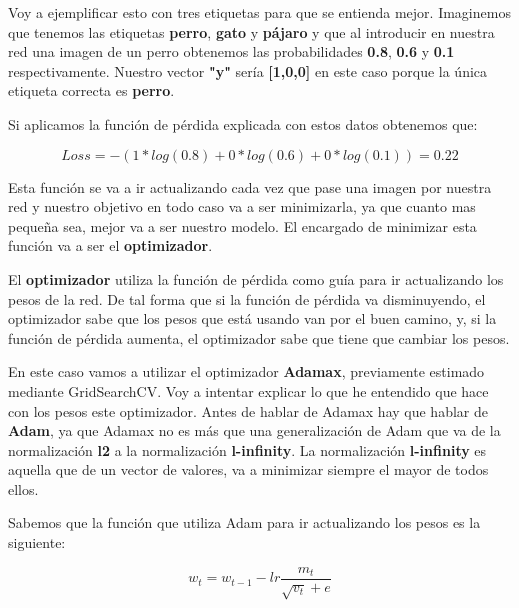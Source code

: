 Voy a ejemplificar esto con tres etiquetas para que se entienda mejor. Imaginemos que tenemos las etiquetas \textbf{perro}, \textbf{gato} y \textbf{pájaro} y que al introducir en nuestra red una imagen de un perro obtenemos las probabilidades \textbf{0.8}, \textbf{0.6} y \textbf{0.1} respectivamente. Nuestro vector \textbf{"y"} sería \textbf{[1,0,0]} en este caso porque la única etiqueta correcta es \textbf{perro}.

\vspace{2 mm}

Si aplicamos la función de pérdida explicada con estos datos obtenemos que:

\[Loss = - (1*log(0.8) + 0*log(0.6) + 0*log(0.1)) = 0.22\]


\vspace{2 mm}

Esta función se va a ir actualizando cada vez que pase una imagen por nuestra red y nuestro objetivo en todo caso va a ser minimizarla, ya que cuanto mas pequeña sea, mejor va a ser nuestro modelo. El encargado de minimizar esta función va a ser el \textbf{optimizador}.

\vspace{5 mm}

El \textbf{optimizador} utiliza la función de pérdida como guía para ir actualizando los pesos de la red. De tal forma que si la función de pérdida va disminuyendo, el optimizador sabe que los pesos que está usando van por el buen camino, y, si la función de pérdida aumenta, el optimizador sabe que tiene que cambiar los pesos.

\vspace{2 mm}

En este caso vamos a utilizar el optimizador \textbf{Adamax}, previamente estimado mediante GridSearchCV. Voy a intentar explicar lo que he entendido que hace con los pesos este optimizador. Antes de hablar de Adamax hay que hablar de \textbf{Adam}, ya que Adamax no es más que una generalización de Adam que va de la normalización \textbf{l2} a la normalización \textbf{l-infinity}. La normalización \textbf{l-infinity} es aquella que de un vector de valores, va a minimizar siempre el mayor de todos ellos. 

\vspace{5 mm}

Sabemos que la función que utiliza Adam para ir actualizando los pesos es la siguiente:

\[w_t = w_{t-1} - lr  \frac{m_t}{\sqrt{v_t} + e} \] 

